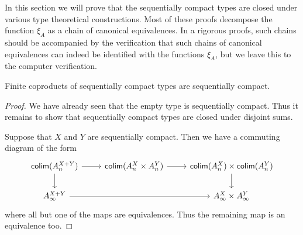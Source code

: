 \begin{comment}
\begin{rmk}
In the literature, an object $X$ of a category $\cat{C}$ is said to be sequentially compact if for any
functor $F:P\to\cat{C}$ from a directed countable partially ordered set $P$, there
is a natural isomorphism
\begin{equation*}
\mathrm{hom}(X,\mathrm{colim}(F(p))) \cong \mathrm{colim}(\mathrm{hom}(X,p))
\end{equation*}
The notion of sequentially compact type $X$ is equivalent to the classical notion,
if one takes a directed poset $P$ to be a Rezk-complete category $P$ in which
each hom-set is a mere proposition, for which there merely is a term of type
\begin{equation*}
\prd{p,q:P}\sm{r:P} (p\leq r)\land (q\leq r).
\end{equation*}
and if one takes a countable set to be a set $X$ for which there merely exists
a function $f:\nat\to X$ such that $\prd{x:X}\hfib{f}{x}$.

In other settings, it might be more useful to replace $\Pi$ and $\Sigma$ in the
notion of directed poset, with the truncated versions $\forall$ and $\exists$. 
\end{rmk}
\end{comment}

In this section we will prove that the sequentially compact types are closed under
various type theoretical constructions. Most of these proofs decompose the
function $\xi_A$ as a chain of canonical equivalences. In a rigorous proofs,
such chains should be accompanied by the verification that such chains of
canonical equivalences can indeed be identified with the functions $\xi_A$, but
we leave this to the computer verification. 

\begin{lem}
Finite coproducts of sequentially compact types are sequentially compact.
\end{lem}

\begin{proof}
We have already seen that the empty type is sequentially compact. 
Thus it remains to show that sequentially compact types are closed under disjoint
sums. 

Suppose that $X$ and $Y$ are sequentially compact. Then we have a commuting diagram of the form
\begin{equation*}
\begin{tikzcd}
\mathsf{colim}(A_n^{X+Y}) \arrow[r] \arrow[d] & \mathsf{colim}(A_n^X\times A_n^Y) \arrow[r] & \mathsf{colim}(A_n^X)\times\mathsf{colim}(A_n^Y) \arrow[d] \\
A_{\infty}^{X+Y} \arrow[rr] & & A_\infty^X \times A_\infty^Y
\end{tikzcd}
\end{equation*}
where all but one of the maps are equivalences. Thus the remaining map is an equivalence too.
\end{proof}

